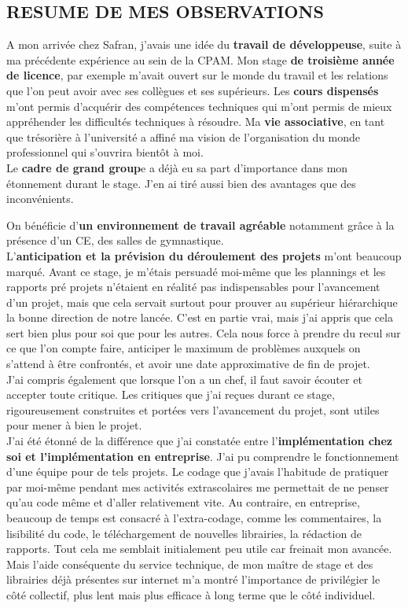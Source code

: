 \subsection{RESUME DE MES OBSERVATIONS}

A mon arrivée chez Safran, j’avais une idée du \textbf{travail de développeuse}, suite à ma précédente expérience au sein de la CPAM. 
Mon stage \textbf{de troisième année de licence}, par exemple m’avait ouvert sur le monde du travail et les relations que l’on peut avoir avec ses collègues et ses supérieurs. Les \textbf{cours dispensés} m’ont permis d’acquérir des compétences techniques qui m’ont permis de mieux appréhender les difficultés techniques à résoudre. Ma \textbf{vie associative}, en tant que trésorière à l’université a affiné ma vision de l’organisation du monde professionnel qui s’ouvrira bientôt à moi.\\

Le \textbf{cadre de grand group}e a déjà eu sa part d’importance dans mon étonnement durant le stage. J’en ai tiré aussi bien des avantages que des inconvénients. 

On bénéficie d’\textbf{un environnement de travail agréable} notamment grâce à la présence d’un CE, des salles de gymnastique.\\ 

L’\textbf{anticipation et la prévision du déroulement des projets} m’ont beaucoup marqué. Avant ce stage, je m’étais persuadé moi-même que les plannings et les rapports pré projets n’étaient en réalité pas indispensables pour l’avancement d’un projet, mais que cela servait surtout pour prouver au supérieur hiérarchique la bonne direction de notre lancée. C’est en partie vrai, mais j’ai appris que cela sert bien plus pour soi que pour les autres. Cela nous force à prendre du recul sur ce que l’on compte faire, anticiper le maximum de problèmes auxquels on s’attend à être confrontés, et avoir une date approximative de fin de projet.\\

J’ai compris également que lorsque l’on a un chef, il faut savoir écouter et accepter toute critique. Les critiques que j’ai reçues durant ce stage, rigoureusement construites et portées vers l’avancement du projet, sont utiles pour mener à bien le projet.\\ 

J’ai été étonné de la différence que j’ai constatée entre l’\textbf{implémentation chez soi et l’implémentation en entreprise}. J’ai pu comprendre le fonctionnement d’une équipe pour de tels projets. Le codage que j’avais l’habitude de pratiquer par moi-même pendant mes activités extrascolaires me permettait de ne penser qu’au code même et d’aller relativement vite. Au contraire, en entreprise, beaucoup de temps est consacré à l’extra-codage, comme les commentaires, la lisibilité du code, le téléchargement de nouvelles librairies, la rédaction de rapports. Tout cela me semblait initialement peu utile car freinait mon avancée. Mais l’aide conséquente du service technique, de mon maître de stage et des librairies déjà présentes sur internet m’a montré l’importance de privilégier le côté collectif, plus lent mais plus efficace à long terme que le côté individuel.\\

